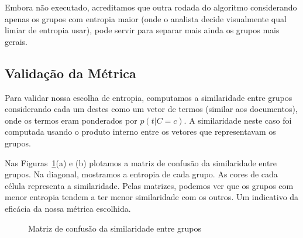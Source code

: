 \documentclass[brazil,a4paper,12pt]{article}
\begin{document}
Embora não executado, acreditamos que outra rodada do algoritmo considerando apenas os grupos
com entropia maior (onde o analista decide visualmente qual limiar de entropia usar), pode servir
para separar mais ainda os grupos mais gerais.

\subsection{Validação da Métrica}

Para validar nossa escolha de entropia, computamos a similaridade entre grupos considerando cada um
destes como um vetor de termos (similar aos documentos), onde os termos eram ponderados por 
$p(t|C = c)$. A similaridade neste caso foi computada usando o produto interno entre os vetores
que representavam os grupos. 

Nas Figuras~\ref{fig:conf}(a) e (b) plotamos a matriz de confusão da
similaridade entre grupos. Na diagonal, mostramos a entropia de cada grupo. As cores
de cada célula representa a similaridade. Pelas matrizes, podemos
ver que os grupos com menor entropia tendem a ter menor similaridade com os outros. Um indicativo
da eficácia da nossa métrica escolhida.

\begin{figure}[t!]
 \centering
 \mbox{}
 \mbox{}
 \caption{Matriz de confusão da similaridade entre grupos}
 \label{fig:conf}
\end{figure}
\end{document}
